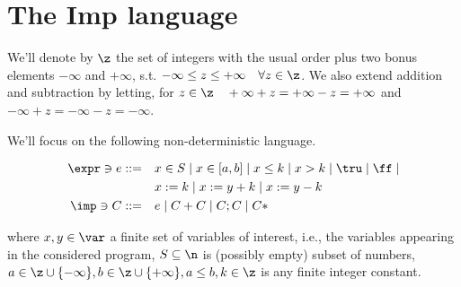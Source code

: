 \section{The Imp language}

We'll denote by \(\z\) the set of integers with the usual order plus
two bonus elements \(-\infty\) and \(+\infty\), s.t. \(-\infty \leq z
\leq +\infty \quad \forall z \in \z\). We also extend addition and
subtraction by letting, for \(z \in \z \quad +\infty + z = + \infty -
z = + \infty\) and \(-\infty + z = - \infty -z = - \infty\).

We'll focus on the following non-deterministic language.

\begin{align*}
  \expr \ni e ::= & \quad x \in S \mid x \in [a,b] \mid x \leq k \mid x > k \mid \tru \mid \ff \mid \\
  & \quad x := k \mid x := y + k \mid x := y - k \\
  \imp \ni C ::= & \quad e \mid C + C \mid C ; C \mid C*
\end{align*}

where \(x, y \in \var\) a finite set of variables of interest, i.e.,
the variables appearing in the considered program, \(S\subseteq \n\)
is (possibly empty) subset of numbers, \(a \in \z\cup \{-\infty\},
b\in\z\cup\{+\infty\}, a\leq b, k \in \z\) is any finite integer
constant.
